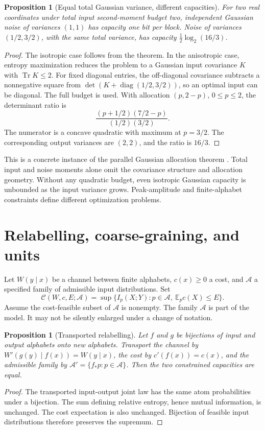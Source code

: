 \documentclass{article}
\newtheorem{proposition}[theorem]{Proposition}
\begin{document}
\begin{proposition}[Equal total Gaussian variance, different capacities]
For two real coordinates under total input second-moment budget two, independent Gaussian noise of variances \((1,1)\) has capacity one bit per block. Noise of variances \((1/2,3/2)\), with the same total variance, has capacity \(\frac12\log_2(16/3)\).
\end{proposition}
\begin{proof}
The isotropic case follows from the theorem. In the anisotropic case, entropy maximization reduces the problem to a Gaussian input covariance \(K\) with \(\operatorname{Tr}K\le2\). For fixed diagonal entries, the off-diagonal covariance subtracts a nonnegative square from \(\det(K+\operatorname{diag}(1/2,3/2))\), so an optimal input can be diagonal. The full budget is used. With allocation \((p,2-p)\), \(0\le p\le2\), the determinant ratio is
\[
\frac{(p+1/2)(7/2-p)}{(1/2)(3/2)}.
\]
The numerator is a concave quadratic with maximum at \(p=3/2\). The corresponding output variances are \((2,2)\), and the ratio is \(16/3\).
\end{proof}

This is a concrete instance of the parallel Gaussian allocation theorem \cite{polyanskiy17}. Total input and noise moments alone omit the covariance structure and allocation geometry. Without any quadratic budget, even isotropic Gaussian capacity is unbounded as the input variance grows. Peak-amplitude and finite-alphabet constraints define different optimization problems.

\section{Relabelling, coarse-graining, and units}
Let \(W(y\mid x)\) be a channel between finite alphabets, \(c(x)\ge0\) a cost, and \(\mathcal A\) a specified family of admissible input distributions. Set
\[
\mathcal C(W,c,E;\mathcal A)
=\sup\{I_p(X;Y):p\in\mathcal A,\ \mathbb E_pc(X)\le E\}.
\]
Assume the cost-feasible subset of \(\mathcal A\) is nonempty. The family \(\mathcal A\) is part of the model. It may not be silently enlarged under a change of notation.

\begin{proposition}[Transported relabelling]
Let \(f\) and \(g\) be bijections of input and output alphabets onto new alphabets. Transport the channel by \(W'(g(y)\mid f(x))=W(y\mid x)\), the cost by \(c'(f(x))=c(x)\), and the admissible family by \(\mathcal A'=\{f_*p:p\in\mathcal A\}\). Then the two constrained capacities are equal.
\end{proposition}
\begin{proof}
The transported input-output joint law has the same atom probabilities under a bijection. The sum defining relative entropy, hence mutual information, is unchanged. The cost expectation is also unchanged. Bijection of feasible input distributions therefore preserves the supremum.
\end{proof}
\end{document}
